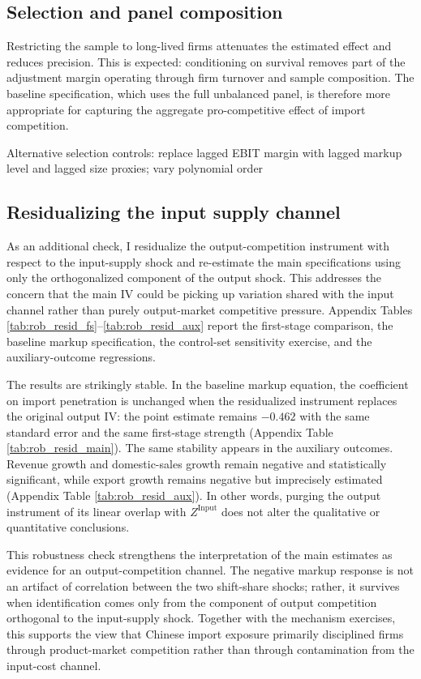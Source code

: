 \documentclass[12pt]{article}
\begin{document}
\subsection{Selection and panel composition}
Restricting the sample to long-lived firms attenuates the estimated effect and reduces precision. This is expected: conditioning on survival removes part of the adjustment margin operating through firm turnover and sample composition. The baseline specification, which uses the full unbalanced panel, is therefore more appropriate for capturing the aggregate pro-competitive effect of import competition.

Alternative selection controls: replace lagged EBIT margin with lagged markup level and lagged size proxies; vary polynomial order 

\subsection{Residualizing the input supply channel}
As an additional check, I residualize the output-competition instrument with respect to the input-supply shock and re-estimate the main specifications using only the orthogonalized component of the output shock. This addresses the concern that the main IV could be picking up variation shared with the input channel rather than purely output-market competitive pressure. Appendix Tables \ref{tab:rob_resid_fs}--\ref{tab:rob_resid_aux} report the first-stage comparison, the baseline markup specification, the control-set sensitivity exercise, and the auxiliary-outcome regressions.

The results are strikingly stable. In the baseline markup equation, the coefficient on import penetration is unchanged when the residualized instrument replaces the original output IV: the point estimate remains $-0.462$ with the same standard error and the same first-stage strength (Appendix Table \ref{tab:rob_resid_main}). The same stability appears in the auxiliary outcomes. Revenue growth and domestic-sales growth remain negative and statistically significant, while export growth remains negative but imprecisely estimated (Appendix Table \ref{tab:rob_resid_aux}). In other words, purging the output instrument of its linear overlap with $Z^{\text{Input}}$ does not alter the qualitative or quantitative conclusions.

This robustness check strengthens the interpretation of the main estimates as evidence for an output-competition channel. The negative markup response is not an artifact of correlation between the two shift-share shocks; rather, it survives when identification comes only from the component of output competition orthogonal to the input-supply shock. Together with the mechanism exercises, this supports the view that Chinese import exposure primarily disciplined firms through product-market competition rather than through contamination from the input-cost channel.
\end{document}
